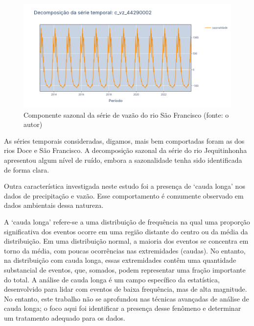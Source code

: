 \begin{figure}[!h]
\centering
\includegraphics[scale=0.33]{Figuras/sazonalidade_rio_sao_francisco.png}
\caption{Componente sazonal da série de vazão do rio São Francisco (fonte: o autor)}
\label{fig:sazonalidade_rio_sao_francisco}
\end{figure}
\clearpage

As séries temporais consideradas, digamos, mais bem comportadas foram as dos rios Doce e São Francisco. A decomposição sazonal da série do rio Jequitinhonha apresentou algum nível de ruído, embora a sazonalidade tenha sido identificada de forma clara.

%

Outra característica investigada neste estudo foi a presença de `cauda longa' nos dados de precipitação e vazão. Esse comportamento é comumente observado em dados ambientais dessa natureza.\cite{elena_macdonald_2023}

A `cauda longa' refere-se a uma distribuição de frequência na qual uma proporção significativa dos eventos ocorre em uma região distante do centro ou da média da distribuição. Em uma distribuição normal, a maioria dos eventos se concentra em torno da média, com poucas ocorrências nas extremidades (caudas). No entanto, na distribuição com cauda longa, essas extremidades contêm uma quantidade substancial de eventos, que, somados, podem representar uma fração importante do total. A análise de cauda longa é um campo específico da estatística, desenvolvido para lidar com eventos de baixa frequência, mas de alta magnitude. No entanto, este trabalho não se aprofundou nas técnicas avançadas de análise de cauda longa; o foco aqui foi identificar a presença desse fenômeno e determinar um tratamento adequado para os dados.


